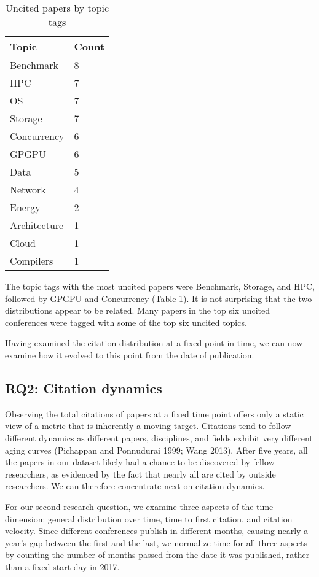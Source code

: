 \documentclass{article}
\begin{document}
\begin{table}

\caption{\label{tab:uncited-topics}Uncited papers by topic tags}
\centering
\begin{tabular}[t]{ll}
\toprule
Topic & Count\\
\midrule
Benchmark & 8\\
HPC & 7\\
OS & 7\\
Storage & 7\\
Concurrency & 6\\
GPGPU & 6\\
Data & 5\\
Network & 4\\
Energy & 2\\
Architecture & 1\\
Cloud & 1\\
Compilers & 1\\
\bottomrule
\end{tabular}
\end{table}

The topic tags with the most uncited papers were Benchmark, Storage, and HPC, followed by GPGPU and Concurrency (Table \ref{tab:uncited-topics}).
It is not surprising that the two distributions appear to be related.
Many papers in the top six uncited conferences were tagged with some of the top six uncited topics.

Having examined the citation distribution at a fixed point in time, we can now examine how it evolved to this point from the date of publication.

\hypertarget{rq2-citation-dynamics}{%
\subsection{RQ2: Citation dynamics}\label{rq2-citation-dynamics}}

Observing the total citations of papers at a fixed time point offers only a static view of a metric that is inherently a moving target.
Citations tend to follow different dynamics as different papers, disciplines, and fields exhibit very different aging curves (Pichappan and Ponnudurai 1999; Wang 2013).
After five years, all the papers in our dataset likely had a chance to be discovered by fellow researchers, as evidenced by the fact that nearly all are cited by outside researchers.
We can therefore concentrate next on citation dynamics.

For our second research question, we examine three aspects of the time dimension: general distribution over time, time to first citation, and citation velocity.
Since different conferences publish in different months, causing nearly a year's gap between the first and the last, we normalize time for all three aspects by counting the number of months passed from the date it was published, rather than a fixed start day in 2017.
\end{document}

